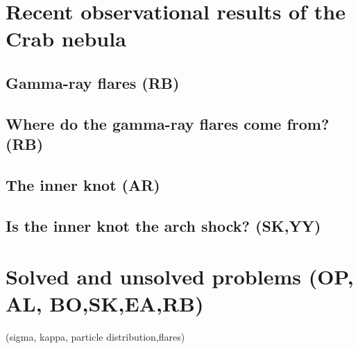 \section{Recent observational results of the Crab nebula}
\subsection{Gamma-ray flares (RB)}
\subsection{Where do the gamma-ray flares come from?                  (RB)}
\subsection{The inner knot   (AR)}
\subsection{Is the inner knot the arch shock?                                      (SK,YY)}

\section{Solved and unsolved problems      (OP, AL, BO,SK,EA,RB)}
(sigma, kappa, particle distribution,flares)
